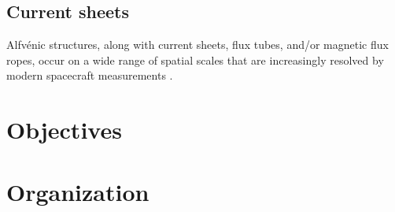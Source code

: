 \subsection{Current sheets}
Alfv\'enic structures, along with current sheets, flux tubes, and/or magnetic flux ropes, occur on a wide range of spatial scales that are increasingly resolved by modern spacecraft measurements \citep{Greco:2018, Pecora:2019, Zheng:2018, Artemyev:2019}.

\section{Objectives}

\section{Organization}

